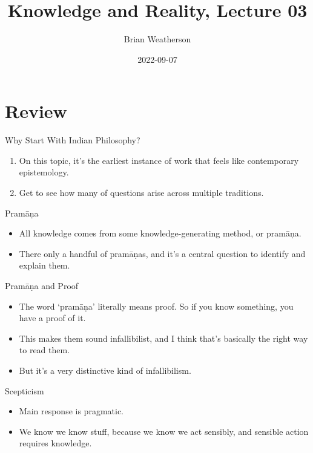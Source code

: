 \documentclass[
  17pt,
  letterpaper,
  ignorenonframetext,
  aspectratio=169,
  handout]{beamer}
\title{Knowledge and Reality, Lecture 03}
\author{Brian Weatherson}
\date{2022-09-07}
\providecommand{\tightlist}{%
  \setlength{\itemsep}{0pt}\setlength{\parskip}{0pt}}\usepackage{longtable,booktabs,array}
\begin{document}
\frame{\titlepage}
\ifdefined\Shaded\renewenvironment{Shaded}{\begin{tcolorbox}[borderline west={3pt}{0pt}{shadecolor}, interior hidden, enhanced, breakable, sharp corners, frame hidden, boxrule=0pt]}{\end{tcolorbox}}\fi

\hypertarget{review}{%
\section{Review}\label{review}}

\begin{frame}{Why Start With Indian Philosophy?}
\protect\hypertarget{why-start-with-indian-philosophy}{}
\begin{enumerate}[<+->]
\tightlist
\item
  On this topic, it's the earliest instance of work that feels like
  contemporary epistemology.
\item
  Get to see how many of questions arise across multiple traditions.
\end{enumerate}
\end{frame}

\begin{frame}{Pramāṇa}
\protect\hypertarget{pramux101ux1e47a}{}
\begin{itemize}[<+->]
\tightlist
\item
  All knowledge comes from some knowledge-generating method, or pramāṇa.
\item
  There only a handful of pramāṇas, and it's a central question to
  identify and explain them.
\end{itemize}
\end{frame}

\begin{frame}{Pramāṇa and Proof}
\protect\hypertarget{pramux101ux1e47a-and-proof}{}
\begin{itemize}[<+->]
\tightlist
\item
  The word `pramāṇa' literally means proof. So if you know something,
  you have a proof of it.
\item
  This makes them sound infallibilist, and I think that's basically the
  right way to read them.
\item
  But it's a very distinctive kind of infallibilism.
\end{itemize}
\end{frame}

\begin{frame}{Scepticism}
\protect\hypertarget{scepticism}{}
\begin{itemize}[<+->]
\tightlist
\item
  Main response is pragmatic.
\item
  We know we know stuff, because we know we act sensibly, and sensible
  action requires knowledge.
\end{itemize}
\end{frame}
\end{document}
